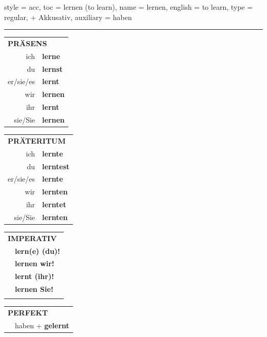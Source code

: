 \begin{verbentry}{
  style = {acc},
  toc = {lernen (to learn)},
  name = {lernen},
  english = {to learn},
  type = {regular, + Akkusativ},
  auxiliary = {haben}
}
 
    
     \vspace{5pt}

    \hrule
    
    \vspace{5pt}

  \begin{tabular}{rl}
     \multicolumn{2}{l}{\textbf{PRÄSENS} }\\
    ich & \textbf{lerne}\\
    du & \textbf{lernst}\\
    er/sie/es & \textbf{lernt}\\
    wir & \textbf{lernen}\\
    ihr & \textbf{lernt}\\
    sie/Sie & \textbf{lernen}\\
  \end{tabular}
  \hfill
     \begin{tabular}{rl}
    \multicolumn{2}{l}{\textbf{PRÄTERITUM} }\\
    ich & \textbf{lernte}\\
    du & \textbf{lerntest}\\
    er/sie/es & \textbf{lernte}\\
    wir & \textbf{lernten}\\
    ihr & \textbf{lerntet}\\
    sie/Sie & \textbf{lernten}\\
  \end{tabular}
  \hfill
  \begin{tabular}{rl}
     \multicolumn{2}{l}{\textbf{IMPERATIV} }\\
   & \textbf{lern(e) (du)!}\\
   & \textbf{lernen wir!}\\
   & \textbf{lernt (ihr)!}\\
   & \textbf{lernen Sie!}\\
   & \vspace{10pt}
  \end{tabular}

    \vspace{10pt}

 \begin{tabular}{rl}
     \multicolumn{2}{l}{\textbf{PERFEKT}}\\
  &  haben + \textbf{gelernt}\\
  \end{tabular}
\hfill
   \begin{tabular}{rl}
   

\end{tabular}
\end{verbentry}
